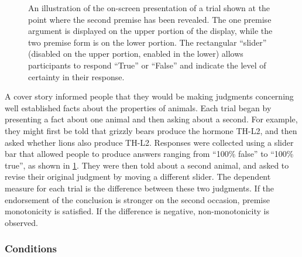 \documentclass[doc,12pt]{apa}
\newcommand{\relevant}{\textsc{Both Relevant}}
\newcommand{\random}{\textsc{Both Random}}
\begin{document}
\begin{figure}[t]
\begin{center}
\vspace{-3mm}
\caption{%
An illustration of the on-screen presentation of a trial shown at the
point where the second premise has been revealed. The one premise argument
is displayed on the upper portion of the display, while the two premise form is on the lower portion. The rectangular ``slider'' (disabled on
the upper portion, enabled in the lower) allows participants to respond
``True'' or ``False'' and indicate the level of certainty in their response.
}
\label{fig:trial}
\end{center}
\end{figure}

A cover story informed people that they would be making judgments concerning well established facts about the properties of animals. Each trial began by presenting a fact about one animal and then asking about a second. For example, they might first be told that grizzly bears produce the hormone TH-L2, and then asked whether lions also produce TH-L2. Responses were collected using a slider bar that allowed people to produce answers ranging from ``100\% false'' to ``100\% true'', as shown in \cref{fig:trial}. They were then told about a second animal, and asked to revise their original judgment by moving a different slider. The dependent measure for each trial is the difference between these two judgments. If the endorsement of the conclusion is stronger on the second occasion, premise monotonicity is satisfied. If the difference is negative, non-monotonicity is observed.

\subsubsection{Conditions}

\end{document}
